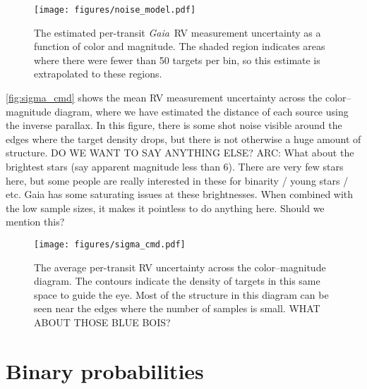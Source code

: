 \documentclass[modern, letterpaper]{aastex631}
\newcommand{\project}[1]{\textsl{#1}}
\newcommand{\Gaia}{\project{Gaia}}
\begin{document}
\begin{figure}
	\begin{centering}
		\texttt{[image: figures/noise\_model.pdf]}
		\caption{The estimated per-transit \Gaia\ RV measurement uncertainty as a function of color and magnitude.
			The shaded region indicates areas where there were fewer than 50 targets per bin, so this estimate is extrapolated to these regions.}
		\label{fig:noise_model}
	\end{centering}
\end{figure}

\autoref{fig:sigma_cmd} shows the mean RV measurement uncertainty across the color--magnitude diagram, where we have estimated the distance of each source using the inverse parallax.
In this figure, there is some shot noise visible around the edges where the target density drops, but there is not otherwise a huge amount of structure.
DO WE WANT TO SAY ANYTHING ELSE?
ARC: What about the brightest stars (say apparent magnitude less than 6). There are very few stars here, but some people are really interested in these for binarity / young stars / etc. Gaia has some saturating issues at these brightnesses. When combined with the low sample sizes, it makes it pointless to do anything here. Should we mention this?

\begin{figure}
	\begin{centering}
		\texttt{[image: figures/sigma\_cmd.pdf]}
		\caption{The average per-transit RV uncertainty across the color--magnitude diagram.
			The contours indicate the density of targets in this same space to guide the eye.
			Most of the structure in this diagram can be seen near the edges where the number of samples is small.
			WHAT ABOUT THOSE BLUE BOIS?}
		\label{fig:sigma_cmd}
	\end{centering}
\end{figure}


\section{Binary probabilities}
\end{document}
